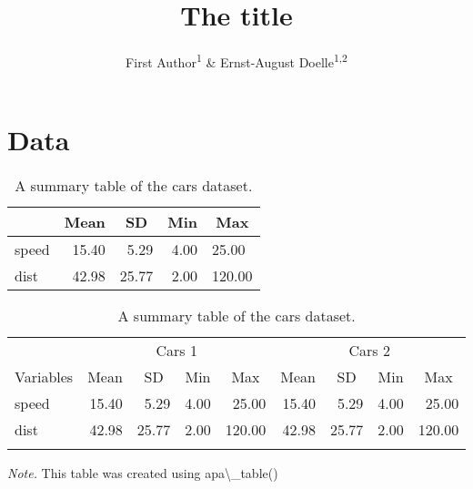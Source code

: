 \documentclass[
  english,
  man, fleqn, noextraspace]{apa6}
\title{The title}
\author{First Author\textsuperscript{1} \& Ernst-August Doelle\textsuperscript{1,2}}
\date{}
\affiliation{\vspace{0.5cm}\textsuperscript{1} Wilhelm-Wundt-University\\\textsuperscript{2} Konstanz Business School}
\begin{document}
\maketitle

\hypertarget{data}{%
\section{Data}\label{data}}

\begin{table}[tbp]

\begin{center}
\begin{threeparttable}

\caption{\label{tab:unnamed-chunk-3}A summary table of the cars dataset.}

\begin{tabular}{lrrrl}
\toprule
 & \multicolumn{1}{c}{Mean} & \multicolumn{1}{c}{SD} & \multicolumn{1}{c}{Min} & \multicolumn{1}{c}{Max}\\
\midrule
speed & 15.40 & 5.29 & 4.00 & 25.00\\
dist & 42.98 & 25.77 & 2.00 & 120.00\\
\bottomrule
\end{tabular}

\end{threeparttable}
\end{center}

\end{table}

\begin{table}[tbp]

\begin{center}
\begin{threeparttable}

\caption{\label{tab:unnamed-chunk-3}A summary table of the cars dataset.}

\begin{tabular}{lrrrrrrrr}
\toprule
 & \multicolumn{4}{c}{Cars 1} & \multicolumn{4}{c}{Cars 2} \\
\cmidrule(r){2-5} \cmidrule(r){6-9}
Variables & \multicolumn{1}{c}{Mean} & \multicolumn{1}{c}{SD} & \multicolumn{1}{c}{Min} & \multicolumn{1}{c}{Max} & \multicolumn{1}{c}{Mean} & \multicolumn{1}{c}{SD} & \multicolumn{1}{c}{Min} & \multicolumn{1}{c}{Max}\\
\midrule
speed & 15.40 & 5.29 & 4.00 & 25.00 & 15.40 & 5.29 & 4.00 & 25.00\\
dist & 42.98 & 25.77 & 2.00 & 120.00 & 42.98 & 25.77 & 2.00 & 120.00\\
\bottomrule
\addlinespace
\end{tabular}

\begin{tablenotes}[para]
\normalsize{\textit{Note.} This table was created using apa\textbackslash{}\_table()}
\end{tablenotes}

\end{threeparttable}
\end{center}

\end{table}
\end{document}
